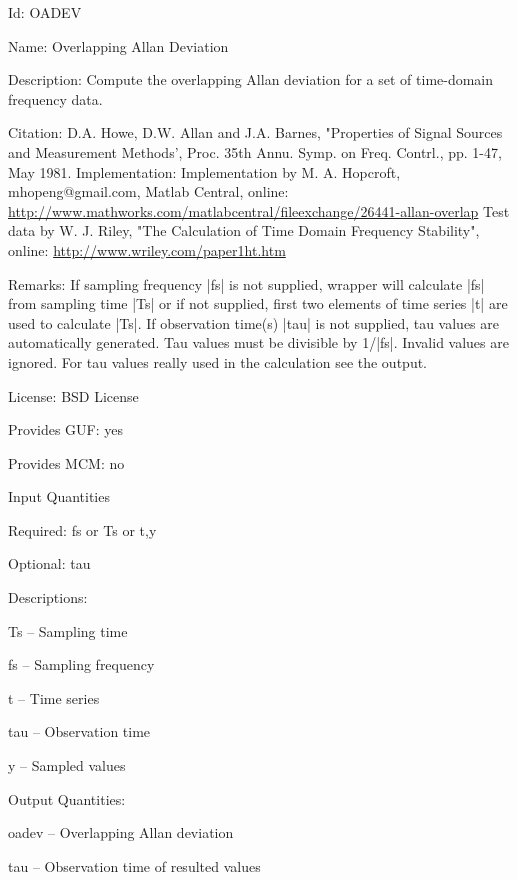 \begin{tightdesc}
\item [Id:] OADEV
\item [Name:] Overlapping Allan Deviation
\item [Description:] Compute the overlapping Allan deviation for a set of time-domain frequency data.
\item [Citation:] D.A. Howe, D.W. Allan and J.A. Barnes, "Properties of Signal Sources and Measurement Methods', Proc. 35th Annu. Symp. on Freq. Contrl., pp. 1-47, May 1981. Implementation: Implementation by M. A. Hopcroft, mhopeng@gmail.com, Matlab Central, online: \url{http://www.mathworks.com/matlabcentral/fileexchange/26441-allan-overlap} Test data by W. J. Riley, "The Calculation of Time Domain Frequency Stability", online: \url{http://www.wriley.com/paper1ht.htm}
\item [Remarks:] If sampling frequency |fs| is not supplied, wrapper will calculate |fs| from sampling time |Ts| or if not supplied, first two elements of time series |t| are used to calculate |Ts|. If observation time(s) |tau| is not supplied, tau values are automatically generated. Tau values must be divisible by 1/|fs|. Invalid values are ignored. For tau values really used in the calculation see the output.
\item [License:] BSD License
\item [Provides GUF:] yes
\item [Provides MCM:] no
\item [Input Quantities] \rule{0em}{0em}
    \begin{tightdesc}
    \item [Required:] 
        \textsf{fs} or \textsf{Ts} or \textsf{t},\enspace \textsf{y}
    \item [Optional:] 
        \textsf{tau}
    \item [Descriptions:] \rule{0em}{0em}
        \begin{tightdesc}
            \item[\textsf{Ts}] -- Sampling time
            \item[\textsf{fs}] -- Sampling frequency
            \item[\textsf{t}] -- Time series
            \item[\textsf{tau}] -- Observation time
            \item[\textsf{y}] -- Sampled values
        \end{tightdesc}
    \end{tightdesc}
\item [Output Quantities:] \rule{0em}{0em}
    \begin{tightdesc}
        \item[\textsf{oadev}] -- Overlapping Allan deviation
        \item[\textsf{tau}] -- Observation time of resulted values
    \end{tightdesc}
\end{tightdesc}
